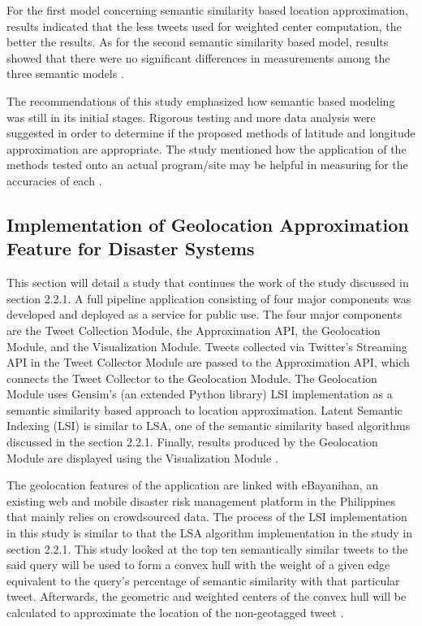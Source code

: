 For the first model concerning semantic similarity based location approximation, results indicated that the less tweets used for weighted center computation, the better the results. As for the second semantic similarity based model, results showed that there were no significant differences in measurements among the three semantic models \cite{ROSALES2017}.

The recommendations of this study emphasized how semantic based modeling was still in its initial stages. Rigorous testing and more data analysis were suggested in order to determine if the proposed methods of latitude and longitude approximation are appropriate. The study mentioned how the application of the methods tested onto an actual program/site may be helpful in measuring for the accuracies of each \cite{ROSALES2017}.

\subsection{Implementation of Geolocation Approximation Feature for Disaster Systems}
This section will detail a study that continues the work of the study discussed in section 2.2.1. A full pipeline application consisting of four major components was developed and deployed as a service for public use. The four major components are the Tweet Collection Module, the Approximation API, the Geolocation Module, and the Visualization Module. Tweets collected via Twitter’s Streaming API in the Tweet Collector Module are passed to the Approximation API, which connects the Tweet Collector to the Geolocation Module. The Geolocation Module uses Gensim’s (an extended Python library) LSI implementation as a semantic similarity based approach to location approximation. Latent Semantic Indexing (LSI) is similar to LSA, one of the semantic similarity based algorithms discussed in the section 2.2.1. Finally, results produced by the Geolocation Module are displayed using the Visualization Module \cite{VELASCOBERMEJODOMINGO2018}.

The geolocation features of the application are linked with eBayanihan, an existing web and mobile disaster risk management platform in the Philippines that mainly relies on crowdsourced data. The process of the LSI implementation in this study is similar to that the LSA algorithm implementation in the study in section 2.2.1. This study looked at the top ten semantically similar tweets to the said query will be used to form a convex hull with the weight of a given edge equivalent to the query’s percentage of semantic similarity with that particular tweet. Afterwards, the geometric and weighted centers of the convex hull will be calculated to approximate the location of the non-geotagged tweet \cite{VELASCOBERMEJODOMINGO2018}.

